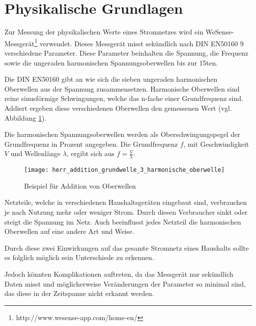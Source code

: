 \section{Physikalische Grundlagen} \label{physikalischeGrundlagen}
    Zur Messung der physikalischen Werte eines Stromnetzes wird ein WeSense-Messgerät\footnote{http://www.wesense-app.com/home-en/} verwendet.
    Dieses Messgerät misst sekündlich nach DIN EN50160\cite{WesenseManual} 9 verschiedene Parameter.
    Diese Parameter beinhalten die Spannung, die Frequenz sowie die ungeraden harmonischen Spannungsoberwellen bis zur 15ten\cite[S.2, Kapitel 1.2]{WesenseManual}.
    \newline

    Die DIN EN50160\cite{EN50160} gibt an wie sich die sieben ungeraden harmonischen Oberwellen aus der Spannung zusammensetzen.
    Harmonische Oberwellen sind reine sinusförmige Schwingungen, welche das n-fache einer Grundfrequenz sind.
    Addiert ergeben diese verschiedenen Oberwellen den gemessenen Wert (vgl. Abbildung \ref{fig:AddierteOberwwellen}).

    Die harmonischen Spannungsoberwellen werden als Oberschwingungspegel der Grundfrequenz in Prozent angegeben.
    Die Grundfrequenz \( f \), mit Geschwindigkeit \( V \) und Wellenlänge \( \lambda \), ergibt sich aus \( f = \frac{V}{\lambda} \).

    \begin{figure}[H]
        \centering
        \texttt{[image: herr\_addition\_grundwelle\_3\_harmonische\_oberwelle]}
        \caption[Addition von Oberwellen]{Beispiel für Addition von Oberwellen \footnotemark }
        \label{fig:AddierteOberwwellen}
    \end{figure}

    Netzteile, welche in verschiedenen Haushaltsgeräten eingebaut sind, verbrauchen je nach Nutzung mehr oder weniger Strom.
    Durch diesen Verbraucher sinkt oder steigt die Spannung im Netz.
    Auch beeinflusst jedes Netzteil die harmonischen Oberwellen auf eine andere Art und Weise.
    
    Durch diese zwei Einwirkungen auf das gesamte Stromnetz eines Haushalts sollte es folglich möglich sein Unterschiede zu erkennen.
    
    Jedoch könnten Komplikationen auftreten, da das Messgerät nur sekündlich Daten misst und möglicherweise Veränderungen der Parameter so minimal sind, das diese in der Zeitspanne nicht erkannt werden. 

